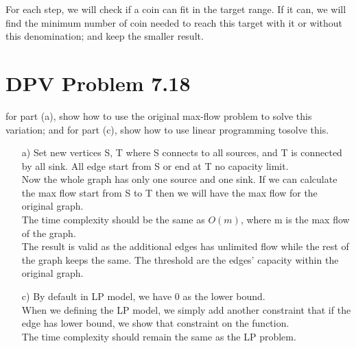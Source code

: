 \documentclass{article}
\def\math#1{$#1$}
\begin{document}
For each step, we will check if a coin can fit in the target range. If it can, we will find the minimum number of coin needed to reach this target with it or without this denomination; and keep the smaller result.

\section{DPV Problem 7.18} 
for part (a), show how to use the original max-flow problem to solve this variation; and for part (c), show how to use linear programming tosolve this.

\begin{itemize}
    \item [a)] Set new vertices S, T where S connects to all sources, and T is connected by all sink. All edge start from S or end at T no capacity limit. \\
    Now the whole graph has only one source and one sink. If we can calculate the max flow start from S to T then we will have the max flow for the original graph. \\
    The time complexity should be the same as \math{O(m)}, where m is the max flow of the graph. \\
    The result is valid as the additional edges has unlimited flow while the rest of the graph keeps the same. The threshold are the edges' capacity within the original graph.  
    \item [c)] By default in LP model, we have 0 as the lower bound. \\
    When we defining the LP model, we simply add another constraint that if the edge has lower bound, we show that constraint on the function. \\
    The time complexity should remain the same as the LP problem.
\end{itemize}
\end{document}
